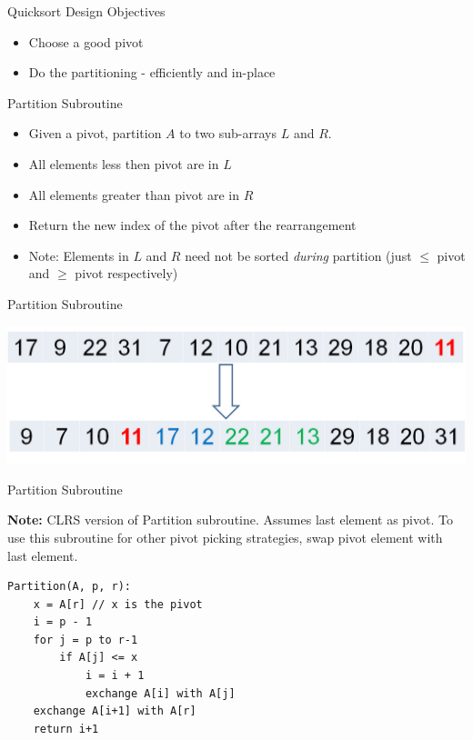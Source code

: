 \documentclass{beamer}
\begin{document}
\begin{frame}{Quicksort Design Objectives}
\begin{itemize}
\item Choose a good pivot
\item Do the partitioning - efficiently and in-place
\end{itemize}
\end{frame}


\begin{frame}{Partition Subroutine}
\begin{itemize}
\item Given a pivot, partition $A$ to two sub-arrays $L$ and $R$. 
\item All elements less then pivot are in $L$ 
\item All elements greater than pivot are in $R$
\item Return the new index of the pivot after the rearrangement
\item Note: Elements in $L$ and $R$ need not be sorted {\em during} partition (just $\leq$ pivot and $\geq$ pivot respectively)
\end{itemize}
\end{frame}


\begin{frame}{Partition Subroutine}
\begin{center}
    \includegraphics[scale=0.4]{partitionSubroutineMeta.png}
\end{center}
\end{frame}


\begin{frame}[fragile]{Partition Subroutine}

{\bf Note:} CLRS version of Partition subroutine. Assumes last element as pivot. 
To use this subroutine for other pivot picking strategies, swap pivot element with last element.

\begin{verbatim}
Partition(A, p, r):
    x = A[r] // x is the pivot
    i = p - 1
    for j = p to r-1
        if A[j] <= x 
            i = i + 1
            exchange A[i] with A[j]
    exchange A[i+1] with A[r]
    return i+1
\end{verbatim}
\end{frame}
\end{document}
